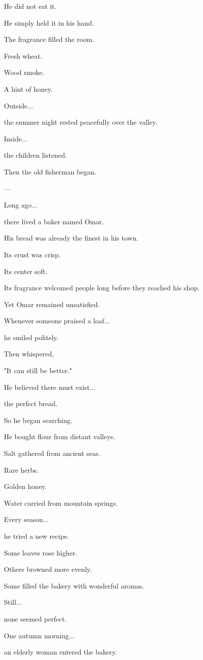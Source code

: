 \documentclass[12pt,openany]{book}
\begin{document}
He did not eat it.

He simply held it in his hand.

The fragrance filled the room.

Fresh wheat.

Wood smoke.

A hint of honey.

Outside...

the summer night rested peacefully over the valley.

Inside...

the children listened.

Then the old fisherman began.

---

Long ago...

there lived a baker named Omar.

His bread was already the finest in his town.

Its crust was crisp.

Its center soft.

Its fragrance welcomed people long before they reached his shop.

Yet Omar remained unsatisfied.

Whenever someone praised a loaf...

he smiled politely.

Then whispered,

"It can still be better."

He believed there must exist...

the perfect bread.

So he began searching.

He bought flour from distant valleys.

Salt gathered from ancient seas.

Rare herbs.

Golden honey.

Water carried from mountain springs.

Every season...

he tried a new recipe.

Some loaves rose higher.

Others browned more evenly.

Some filled the bakery with wonderful aromas.

Still...

none seemed perfect.

One autumn morning...

an elderly woman entered the bakery.
\end{document}
